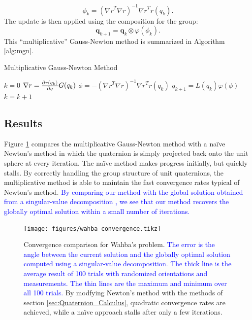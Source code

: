 \documentclass[letterpaper, 10 pt, conference]{ieeeconf}  %
\newcommand{\q}{\textbf{q}}
\newcommand{\added}[1]{\textcolor{blue}{#1}}
\begin{document}
    \begin{equation}
    	\phi_k = ({\nabla r}^T {\nabla r})^{-1} {\nabla r}^T r(q_k).
    \end{equation}
	The update is then applied using the composition for the group:
	\begin{equation}
		\q_{k+1} = \q_k \otimes \varphi(\phi_k).
	\end{equation}
	This ``multiplicative'' Gauss-Newton method is summarized in Algorithm \ref{alg:mgn}.

    \begin{algorithm} 
    	\begin{algorithmic}[1]
    		\caption{Multiplicative Gauss-Newton Method}\label{alg:mgn}
    		\State $k = 0$
    		    \State ${\nabla r} = \pdv{r(q_k)}{q} G(q_k)$ 
    		    \State $ \phi = -({\nabla r}^T {\nabla r})^{-1} {\nabla r}^T r(q_k)$ 
    		    \State $q_{k+1} = L(q_k) \varphi(\phi)$ 
    		    \State $k = k + 1$
    		\EndWhile
    	\end{algorithmic}
    \end{algorithm}



    \subsection{Results} Figure \ref{fig:wahba_convergence} compares the
    multiplicative Gauss-Newton method with a na\"ive Newton's method in
    which the quaternion is simply projected back onto the unit sphere at
    every iteration. The na\"ive method makes progress initially, but quickly
    stalls. By correctly handling the group structure of unit quaternions,
    the multiplicative method is able to maintain the fast convergence rates
    typical of Newton's method. \added{By comparing our method with the
    global solution obtained from a singular-value decomposition
    \cite{markley1999estimate}, we see that our method recovers the globally
    optimal solution within a small number of iterations.} 
    
    \begin{figure}
        \centering
        \texttt{[image: figures/wahba\_convergence.tikz]}
        \caption{Convergence comparison for Wahba's problem. \added{The error
        is the angle between the current solution and the globally optimal
        solution computed using a singular-value decomposition.
        The thick line is the average result of 100 trials with randomized
        orientations and measurements. The thin lines are the maximum and
        minimum over all 100 trials.} By modfying Newton's method with the
        methods of section \ref{sec:Quaternion_Calculus}, quadratic
        convergence rates are achieved, while a na\"ive approach stalls after
        only a few iterations.}
        \label{fig:wahba_convergence}
    \end{figure}
\end{document}
